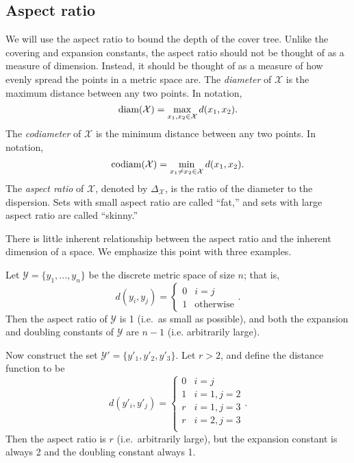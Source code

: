 \documentclass[../main.tex]{subfiles}
\newcommand{\set}[1]{\mathcal {#1}}
\newcommand{\dist}[2]{\distf({#1},{#2})}
\newcommand{\distf}{d}
\newcommand{\diam}[1]{\textnormal{diam}({#1})}
\newcommand{\codiam}[1]{\textnormal{codiam}({#1})}
\newcommand{\aspect}[1]{\Delta_{#1}}
\begin{document}
\fixme{}


\subsection{Aspect ratio}

We will use the aspect ratio to bound the depth of the cover tree.
Unlike the covering and expansion constants,
the aspect ratio should not be thought of as a measure of dimension.
Instead, it should be thought of as a measure of how evenly spread the points in a metric space are.
The \emph{diameter} of $\set X$ is the maximum distance between any two points.
In notation,
\begin{equation}
    \diam {\set X} = \max_{x_1,x_2\in\set X} \dist{x_1}{x_2}
    .
\end{equation}
The \emph{codiameter} of $\set X$ is the minimum distance between any two points.
In notation,
\begin{equation}
    \codiam {\set X} = \min_{x_1 \ne x_2\in\set X} \dist{x_1}{x_2}
    .
\end{equation}
The \emph{aspect ratio} of $\set X$, denoted by $\aspect{\set X}$, 
is the ratio of the diameter to the dispersion.
Sets with small aspect ratio are called ``fat,''
and sets with large aspect ratio are called ``skinny.''

There is little inherent relationship between the aspect ratio and the inherent dimension of a space.
We emphasize this point with three examples.

\begin{example}
    Let $\set Y=\{y_1,...,y_n\}$ be the discrete metric space of size $n$;
    that is,
    \begin{equation}
        \dist{y_i}{y_j}=
        \begin{cases}
            0 & i = j \\
            1 & \text{otherwise}
        \end{cases}
        .
    \end{equation}
    Then the aspect ratio of $\set Y$ is 1 (i.e.\ as small as possible),
    and both the expansion and doubling constants of $\set Y$ are $n-1$ (i.e. arbitrarily large).
\end{example}

\begin{example}
    Now construct the set $\set Y'=\{y'_1, y'_2, y'_3\}$.
    Let $r>2$, and define the distance function to be
    \begin{equation}
        d(y'_i,y'_j) =
        \begin{cases}
            0 & i=j \\
            1 & i=1, j=2 \\
            r & i=1, j=3 \\
            r & i=2, j=3 \\
        \end{cases}
        .
    \end{equation}
    Then the aspect ratio is $r$ (i.e.\ arbitrarily large),
    but the expansion constant is always 2
    and the doubling constant always 1.
\end{example}
\end{document}
